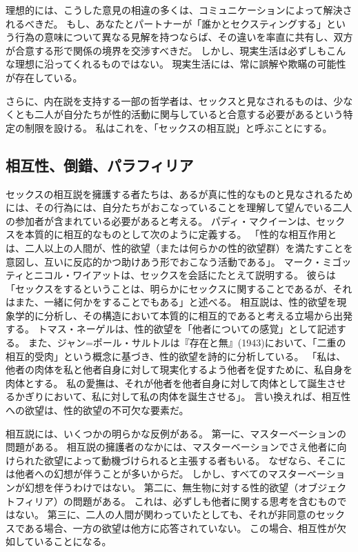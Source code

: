 \documentclass[paper=a4,book,openany]{jlreq} \usepackage{mystyle}
\begin{document}
理想的には、こうした意見の相違の多くは、コミュニケーションによって解決されるべきだ。
もし、あなたとパートナーが「誰かとセクスティングする」という行為の意味について異なる見解を持つならば、その違いを率直に共有し、双方が合意する形で関係の境界を交渉すべきだ。
しかし、現実生活は必ずしもこんな理想に沿ってくれるものではない。
現実生活には、常に誤解や欺瞞の可能性が存在している。

さらに、内在説を支持する一部の哲学者は、セックスと見なされるものは、少なくとも二人が自分たちが性的活動に関与していると合意する必要があるという特定の制限を設ける。
私はこれを、「セックスの相互説」と呼ぶことにする。

\subsection{相互性、倒錯、パラフィリア}

セックスの相互説を擁護する者たちは、あるが真に性的なものと見なされるためには、その行為には、自分たちがおこなっていることを理解して望んでいる二人の参加者が含まれている必要があると考える。
パディ・マクイーンは、セックスを本質的に相互的なものとして次のように定義する。
「性的な相互作用とは、二人以上の人間が、性的欲望（または何らかの性的欲望群）を満たすことを意図し、互いに反応的かつ助けあう形でおこなう活動である」\citep{mcqueen21:_sexual_inter_sexual_infid}。
マーク・ミゴッティとニコル・ワイアットは、セックスを会話にたとえて説明する。
彼らは「セックスをするということは、明らかにセックスに関することであるが、それはまた、一緒に何かをすることでもある」と述べる\citep[p.19]{migotti17:_very_idea_sex_robot}。
相互説は、性的欲望を現象学的に分析し、その構造において本質的に相互的であると考える立場から出発する。
トマス・ネーゲルは、性的欲望を「他者についての感覚」として記述する\citep[p.8]{nagel69:_sexual_perver}。
また、ジャン=ポール・サルトルは『存在と無』(1943)において、「二重の相互的受肉」という概念に基づき、性的欲望を詩的に分析している。
「私は、他者の肉体を私と他者自身に対して現実化するよう他者を促すために、私自身を肉体とする。
私の愛撫は、それが他者を他者自身に対して肉体として誕生させるかぎりにおいて、私に対して私の肉体を誕生させる」\citep[p.514]{sartre43:_being_nothin}。
言い換えれば、相互性への欲望は、性的欲望の不可欠な要素だ。

相互説には、いくつかの明らかな反例がある。
第一に、マスターベーションの問題がある。
相互説の擁護者のなかには、マスターベーションでさえ他者に向けられた欲望によって動機づけられると主張する者もいる。
なぜなら、そこには他者への幻想が伴うことが多いからだ。
しかし、すべてのマスターベーションが幻想を伴うわけではない。
第二に、無生物に対する性的欲望（オブジェクトフィリア）の問題がある。
これは、必ずしも他者に関する思考を含むものではない。
第三に、二人の人間が関わっていたとしても、それが非同意のセックスである場合、一方の欲望は他方に応答されていない。
この場合、相互性が欠如していることになる。
\end{document}
